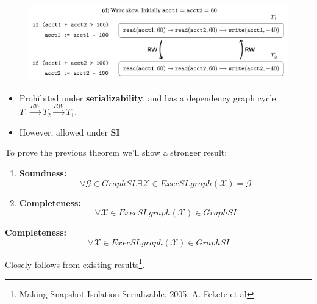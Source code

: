 \documentclass{beamer}
\begin{document}
\begin{frame}
	\begin{figure}
		\includegraphics[scale=0.25]{fig2d}
	\end{figure}
	\begin{itemize}
		\item Prohibited under \textbf{serializability}, and has a dependency graph cycle $ T_1 \xrightarrow{RW} T_2 \xrightarrow{RW} T_1 $.
		\item However, allowed under \textbf{SI}
	\end{itemize}
\end{frame}

\begin{frame}
	To prove the previous theorem we'll show a stronger result:
	\begin{theorem}
		\begin{enumerate}
			\item \textbf{Soundness:} $$ \forall \mathcal{G} \in GraphSI. \exists \mathcal{X} \in ExecSI. graph(\mathcal{X}) = \mathcal{G} $$
			\item \textbf{Completeness:} $$ \forall \mathcal{X} \in ExecSI. graph(\mathcal{X}) \in GraphSI$$
		\end{enumerate}
	\end{theorem}
\end{frame}
\begin{frame}
	\begin{theorem}
		\textbf{Completeness:} $$ \forall \mathcal{X} \in ExecSI. graph(\mathcal{X}) \in GraphSI$$
	\end{theorem}
	Closely follows from existing results\footnote{Making Snapshot Isolation Serializable, 2005, A. Fekete et al}. 
\end{frame}
\end{document}
